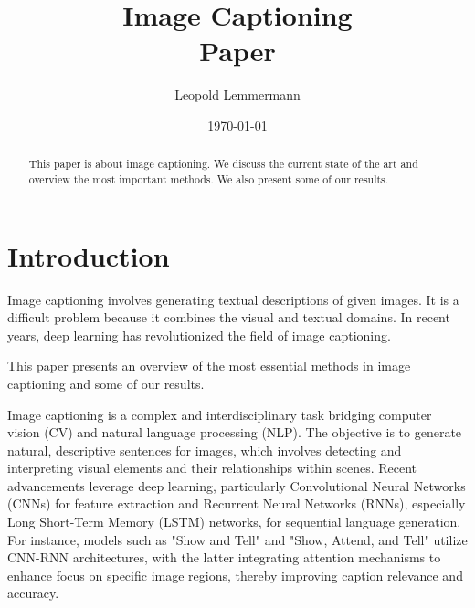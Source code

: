 \documentclass[12pt]{article}
\newcommand{\trauthor}{Leopold Lemmermann}
\newcommand{\trtype}{Paper}
\newcommand{\trtitle}{Image Captioning}
\newcommand{\trdate}{\today}
\theoremstyle{plain}
\theoremstyle{definition}
\theoremstyle{remark}
\begin{document}
\renewcommand{\headheight}{14.5pt}

\fancyhead{}
\fancyhead[CO]{\trtitle}



\title{\trtitle\\[0.3cm]{\normalsize\trtype}}
\author{\trauthor}
\date{\trdate}
\maketitle

\thispagestyle{empty}

\begin{abstract}
 This paper is about image captioning. We discuss the current state of the art and overview the most important methods. We also present some of our results.
\end{abstract}

\tableofcontents
\newpage
{}



\section{Introduction}
\label{sec:introduction}

Image captioning involves generating textual descriptions of given images. It is a difficult problem because it combines the visual and textual domains. In recent years, deep learning has revolutionized the field of image captioning.

This paper presents an overview of the most essential methods in image captioning and some of our results.

Image captioning is a complex and interdisciplinary task bridging computer vision (CV) and natural language processing (NLP). The objective is to generate natural, descriptive sentences for images, which involves detecting and interpreting visual elements and their relationships within scenes. Recent advancements leverage deep learning, particularly Convolutional Neural Networks (CNNs) for feature extraction and Recurrent Neural Networks (RNNs), especially Long Short-Term Memory (LSTM) networks, for sequential language generation. For instance, models such as "Show and Tell" \cite{Vinyals:2015} and "Show, Attend, and Tell" \cite{Xu} utilize CNN-RNN architectures, with the latter integrating attention mechanisms to enhance focus on specific image regions, thereby improving caption relevance and accuracy.
\end{document}
